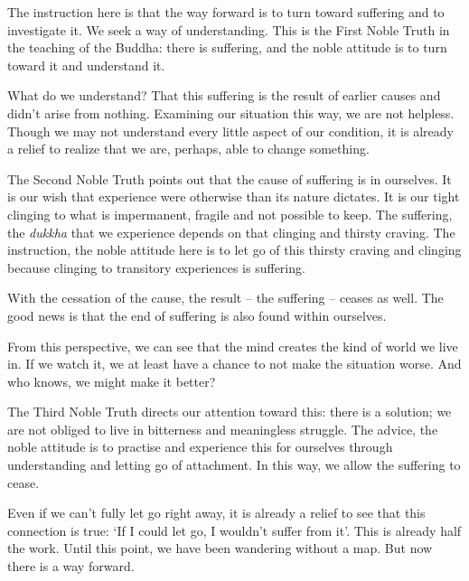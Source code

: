 The instruction here is that the way forward is to turn toward suffering
and to investigate it. We seek a way of understanding. This is the First
Noble Truth in the teaching of the Buddha: there is suffering, and the
noble attitude is to turn toward it and understand it.

What do we understand? That this suffering is the result of earlier
causes and didn't arise from nothing. Examining our situation this way,
we are not helpless. Though we may not understand every little aspect of
our condition, it is already a relief to realize that we are, perhaps,
able to change something.

\clearpage


The Second Noble Truth points out that the cause of suffering is in
ourselves. It is our wish that experience were otherwise than its nature
dictates. It is our tight clinging to what is impermanent, fragile and
not possible to keep. The suffering, the \emph{dukkha} that we
experience depends on that clinging and thirsty craving. The
instruction, the noble attitude here is to let go of this thirsty
craving and clinging because clinging to transitory experiences is
suffering.


With the cessation of the cause, the result -- the suffering -- ceases
as well. The good news is that the end of suffering is also found within
ourselves.

From this perspective, we can see that the mind creates the kind of
world we live in. If we watch it, we at least have a chance to not make
the situation worse. And who knows, we might make it better?

The Third Noble Truth directs our attention toward this: there is a
solution; we are not obliged to live in bitterness and meaningless
struggle. The advice, the noble attitude is to practise and experience
this for ourselves through understanding and letting go of attachment.
In this way, we allow the suffering to cease.

Even if we can't fully let go right away, it is already a relief to see
that this connection is true: `If I could let go, I wouldn't suffer from
it'. This is already half the work. Until this point, we have been
wandering without a map. But now there is a way forward.


\enlargethispage*{\baselineskip}

